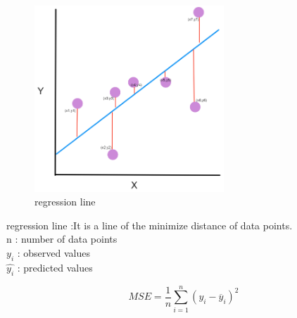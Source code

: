 \documentclass[12pt,a4paper]{article}
\begin{document}
\begin{figure}
\center
\includegraphics[height=7cm]{MSE}
\caption{regression line}
\end{figure}

regression line :It is a line of the minimize distance of data points. \\
n : number of data points\\
$y_i$ :  observed values\\
$\hat{y_i}$ : predicted values\\
\begin{Large}
$$MSE=\frac{1}{n} \sum_{i=1}^n(y_i-\overline{y} _i)^2$$
\end{Large}\\[6pt]
\end{document}
